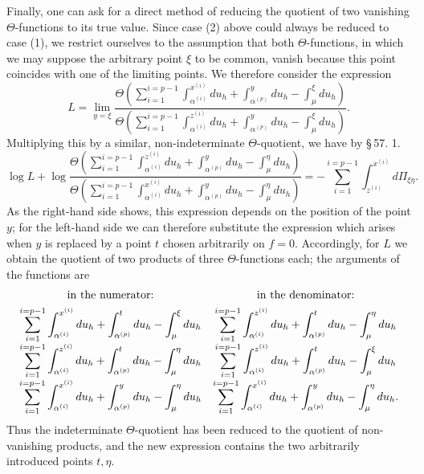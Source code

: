 \documentclass[10pt]{article}
\begin{document}
Finally, one can ask for a direct method of reducing the quotient of two vanishing \(\Theta\)-functions to its true value. Since case (2) above could always be reduced to case (1), we restrict ourselves to the assumption that both \(\Theta\)-functions, in which we may suppose the arbitrary point \(\xi\) to be common, vanish because this point coincides with one of the limiting points. We therefore consider the expression
\[
L=\lim_{y=\xi}
\frac{\Theta\left(\sum_{i=1}^{i=p-1}\int_{\alpha^{(i)}}^{x^{(i)}}du_h+
\int_{\alpha^{(p)}}^{y}du_h-\int_{\mu}^{\xi}du_h\right)}
{\Theta\left(\sum_{i=1}^{i=p-1}\int_{\alpha^{(i)}}^{z^{(i)}}du_h+
\int_{\alpha^{(p)}}^{y}du_h-\int_{\mu}^{\xi}du_h\right)}.
\]
Multiplying this by a similar, non-indeterminate \(\Theta\)-quotient, we have by \S\,57. 1.
\[
\log L+
\log\frac{\Theta\left(\sum_{i=1}^{i=p-1}\int_{\alpha^{(i)}}^{z^{(i)}}du_h+
\int_{\alpha^{(p)}}^{y}du_h-\int_{\mu}^{\eta}du_h\right)}
{\Theta\left(\sum_{i=1}^{i=p-1}\int_{\alpha^{(i)}}^{x^{(i)}}du_h+
\int_{\alpha^{(p)}}^{y}du_h-\int_{\mu}^{\eta}du_h\right)}
= -\sum_{i=1}^{i=p-1}\int_{z^{(i)}}^{x^{(i)}}d\Pi_{\xi\eta}.
\]
As the right-hand side shows, this expression depends on the position of the point \(y\); for the left-hand side we can therefore substitute the expression which arises when \(y\) is replaced by a point \(t\) chosen arbitrarily on \(f=0\). Accordingly, for \(L\) we obtain the quotient of two products of three \(\Theta\)-functions each; the arguments of the functions are
\[
\begin{array}{c@{\quad}c}
\text{in the numerator:} & \text{in the denominator:}\\[0.4em]
\displaystyle \sum_{i=1}^{i=p-1}\int_{\alpha^{(i)}}^{x^{(i)}}du_h+\int_{\alpha^{(p)}}^{t}du_h-\int_{\mu}^{\xi}du_h
&
\displaystyle \sum_{i=1}^{i=p-1}\int_{\alpha^{(i)}}^{z^{(i)}}du_h+\int_{\alpha^{(p)}}^{t}du_h-\int_{\mu}^{\eta}du_h
\\[1.0em]
\displaystyle \sum_{i=1}^{i=p-1}\int_{\alpha^{(i)}}^{z^{(i)}}du_h+\int_{\alpha^{(p)}}^{t}du_h-\int_{\mu}^{\eta}du_h
&
\displaystyle \sum_{i=1}^{i=p-1}\int_{\alpha^{(i)}}^{z^{(i)}}du_h+\int_{\alpha^{(p)}}^{t}du_h-\int_{\mu}^{\xi}du_h
\\[1.0em]
\displaystyle \sum_{i=1}^{i=p-1}\int_{\alpha^{(i)}}^{x^{(i)}}du_h+\int_{\alpha^{(p)}}^{y}du_h-\int_{\mu}^{\eta}du_h
&
\displaystyle \sum_{i=1}^{i=p-1}\int_{\alpha^{(i)}}^{x^{(i)}}du_h+\int_{\alpha^{(p)}}^{y}du_h-\int_{\mu}^{\eta}du_h .
\end{array}
\]
Thus the indeterminate \(\Theta\)-quotient has been reduced to the quotient of non-vanishing products, and the new expression contains the two arbitrarily introduced points \(t,\eta\).
\end{document}
